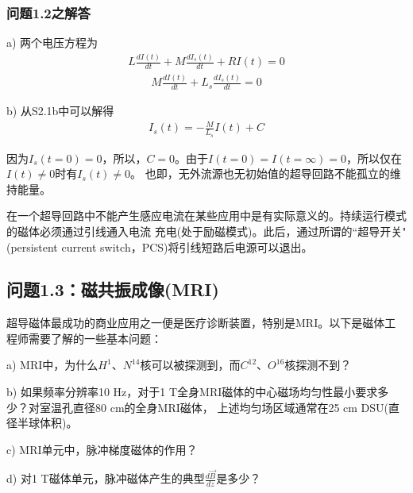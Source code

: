 \subsubsection{问题1.2之解答}
a) 两个电压方程为
\begin{align*}
L\frac{dI(t)}{dt}+M\frac{dI_s(t)}{dt}+ RI(t) = 0 \tag{S2.1a}
\end{align*}
\begin{align*}
M\frac{dI(t)}{dt}+ L_s\frac{dI_s(t)}{dt}= 0 \tag{S2.1b}
\end{align*}

b) 从S2.1b中可以解得
\begin{align*}
I_s(t) = −\frac{M}{L_s}I(t) + C\tag{S2.2}
\end{align*}

因为$I_s(t=0)=0$，所以，$C=0$。由于$I(t=0)=I(t=\infty)=0$，所以仅在$I(t)\neq 0$时有$I_s(t)\neq 0$。
也即，无外流源也无初始值的超导回路不能孤立的维持能量。

在一个超导回路中不能产生感应电流在某些应用中是有实际意义的。持续运行模式的磁体必须通过引线通入电流
充电(处于励磁模式)。此后，通过所谓的``超导开关"(persistent current switch，PCS)将引线短路后电源可以退出。


\subsection{问题1.3：磁共振成像(MRI)}
超导磁体最成功的商业应用之一便是医疗诊断装置，特别是MRI。以下是磁体工程师需要了解的一些基本问题：

a) MRI中，为什么$H^1$、$N^{14}$核可以被探测到，而$C^{12}$、$O^{16}$核探测不到？

b) 如果频率分辨率10 Hz，对于1 T全身MRI磁体的中心磁场均匀性最小要求多少？对室温孔直径80 cm的全身MRI磁体，
上述均匀场区域通常在25 cm DSU(直径半球体积)。

c) MRI单元中，脉冲梯度磁体的作用？

d) 对1 T磁体单元，脉冲磁体产生的典型$\frac{d\vec{B}}{dz}$是多少？


